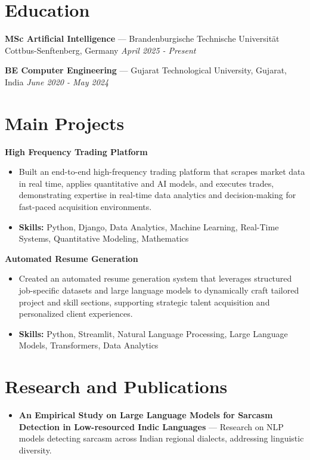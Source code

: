 \documentclass[a4paper,10pt]{article}
\begin{document}
\section*{Education}
\textbf{MSc Artificial Intelligence} — Brandenburgische Technische Universität Cottbus-Senftenberg, Germany \hfill \textit{April 2025 - Present}\par
\vspace{1.5pt}
\textbf{BE Computer Engineering} — Gujarat Technological University, Gujarat, India \hfill \textit{June 2020 - May 2024}\par

\section*{Main Projects}
\textbf{High Frequency Trading Platform}\par
\vspace{1pt}
\begin{itemize}
  \item Built an end-to-end high-frequency trading platform that scrapes market data in real time, applies quantitative and AI models, and executes trades, demonstrating expertise in real-time data analytics and decision-making for fast-paced acquisition environments.
  \item \textbf{Skills:} Python, Django, Data Analytics, Machine Learning, Real-Time Systems, Quantitative Modeling, Mathematics
\end{itemize}
\vspace{3pt}
\textbf{Automated Resume Generation}\par
\vspace{1pt}
\begin{itemize}
  \item Created an automated resume generation system that leverages structured job-specific datasets and large language models to dynamically craft tailored project and skill sections, supporting strategic talent acquisition and personalized client experiences.
  \item \textbf{Skills:} Python, Streamlit, Natural Language Processing, Large Language Models, Transformers, Data Analytics
\end{itemize}

\section*{Research and Publications}
\begin{itemize}
\item \textbf{An Empirical Study on Large Language Models for Sarcasm Detection in Low-resourced Indic Languages} — Research on NLP models detecting sarcasm across Indian regional dialects, addressing linguistic diversity.
\end{itemize}
\end{document}

